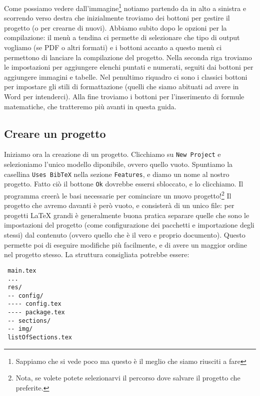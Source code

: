 Come possiamo vedere dall'immagine\footnote{Sappiamo che si vede poco
ma questo è il meglio che siamo riusciti a fare} notiamo partendo da in alto
a sinistra e scorrendo verso destra che inizialmente troviamo dei bottoni per
gestire il progetto (o per crearne di nuovi).
Abbiamo subito dopo le opzioni per la compilazione: il menù a tendina ci
permette di selezionare che tipo di output vogliamo (se PDF o altri formati) e
i bottoni accanto a questo menù ci permettono di lanciare la compilazione
del progetto.
Nella seconda riga troviamo le impostazioni per aggiungere elenchi puntati e
numerati, seguiti dai bottoni per aggiungere immagini e tabelle. Nel penultimo
riquadro ci sono i classici bottoni per impostare gli stili di formattazione
(quelli che siamo abituati ad avere in Word per intenderci).
Alla fine troviamo i bottoni per l'inserimento di formule matematiche, che
tratteremo più avanti in questa guida.

\subsection{Creare un progetto}

Iniziamo ora la creazione di un progetto.
Clicchiamo su \texttt{New Project} e selezioniamo l'unico modello diponibile,
ovvero quello vuoto. Spuntiamo la casellina \texttt{Uses BibTeX} nella sezione
\texttt{Features}, e diamo un nome al nostro progetto. Fatto ciò il bottone
\texttt{Ok} dovrebbe essersi sbloccato, e lo clicchiamo. Il programma creerà
le basi necessarie per cominciare un nuovo progetto!\footnote{Nota, se volete
potete selezionarvi il percorso dove salvare il progetto che preferite.}
Il progetto che avremo davanti è però vuoto, e consisterà di un unico file: per 
progetti \LaTeX{} grandi è generalmente buona pratica separare quelle che sono 
le impostazioni del progetto (come configurazione dei pacchetti e importazione 
degli stessi) dal contenuto (ovvero quello che è il vero e proprio documento). 
Questo permette poi di eseguire modifiche più facilmente, e di avere un maggior 
ordine nel progetto stesso.
La struttura consigliata potrebbe essere:
\begin{verbatim}
 main.tex
 ...
 res/
 -- config/
 ---- config.tex
 ---- package.tex
 -- sections/
 -- img/
 listOfSections.tex
\end{verbatim}

